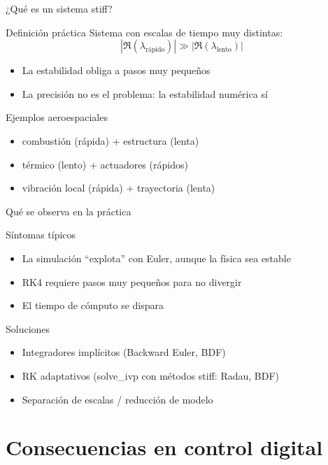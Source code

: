 \documentclass[aspectratio=169,10pt]{beamer}
\newcommand{\importantbox}[2][Importante]{%
\begin{alertblock}{#1}#2\end{alertblock}}
\begin{document}
\begin{frame}{¿Qué es un sistema stiff?}
\small
\begin{block}{Definición práctica}
Sistema con escalas de tiempo muy distintas:
\[
|\Re(\lambda_{\text{rápido}})| \gg |\Re(\lambda_{\text{lento}})|
\]
\end{block}

\begin{itemize}
\item La estabilidad obliga a pasos muy pequeños
\item La precisión no es el problema: la estabilidad numérica sí
\end{itemize}

\importantbox[Ejemplos aeroespaciales]{
\begin{itemize}
\item combustión (rápida) + estructura (lenta)
\item térmico (lento) + actuadores (rápidos)
\item vibración local (rápida) + trayectoria (lenta)
\end{itemize}
}
\end{frame}

\begin{frame}{Qué se observa en la práctica}
\small
\begin{block}{Síntomas típicos}
\begin{itemize}
\item La simulación ``explota'' con Euler, aunque la física sea estable
\item RK4 requiere pasos muy pequeños para no divergir
\item El tiempo de cómputo se dispara
\end{itemize}
\end{block}

\importantbox[Soluciones]{
\begin{itemize}
\item Integradores implícitos (Backward Euler, BDF)
\item RK adaptativos (solve\_ivp con métodos stiff: Radau, BDF)
\item Separación de escalas / reducción de modelo
\end{itemize}
}
\end{frame}

\section{Consecuencias en control digital}
\end{document}
